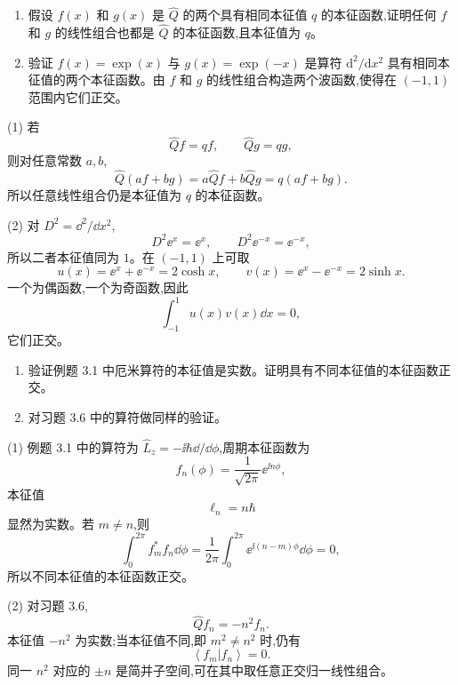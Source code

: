 \begin{question}
\begin{enumerate}
\item 假设 $f(x)$ 和 $g(x)$ 是 $\hat Q$ 的两个具有相同本征值 $q$ 的本征函数,证明任何 $f$ 和 $g$ 的线性组合也都是 $\hat Q$ 的本征函数,且本征值为 $q$。
\item 验证 $f(x)=\exp(x)$ 与 $g(x)=\exp(-x)$ 是算符 $\mathrm d^2/\mathrm dx^2$ 具有相同本征值的两个本征函数。由 $f$ 和 $g$ 的线性组合构造两个波函数,使得在 $(-1,1)$ 范围内它们正交。
\end{enumerate}
\end{question}
\begin{solution}
(1) 若
\[
\hat Q f=qf,
\qquad
\hat Q g=qg,
\]
则对任意常数 $a,b$,
\[
\hat Q(af+bg)=a\hat Qf+b\hat Qg=q(af+bg).
\]
所以任意线性组合仍是本征值为 $q$ 的本征函数。

(2) 对 $D^2=\dd^2/\dd x^2$,
\[
D^2\ee^x=\ee^x,
\qquad
D^2\ee^{-x}=\ee^{-x},
\]
所以二者本征值同为 $1$。在 $(-1,1)$ 上可取
\[
u(x)=\ee^x+\ee^{-x}=2\cosh x,
\qquad
v(x)=\ee^x-\ee^{-x}=2\sinh x.
\]
一个为偶函数,一个为奇函数,因此
\[
\int_{-1}^{1}u(x)v(x)\dd x=0,
\]
它们正交。
\end{solution}

\begin{question}
\begin{enumerate}
\item 验证例题 3.1 中厄米算符的本征值是实数。证明具有不同本征值的本征函数正交。
\item 对习题 3.6 中的算符做同样的验证。
\end{enumerate}
\end{question}
\begin{solution}
(1) 例题 3.1 中的算符为 $\hat L_z=-\ii\hbar\dd/\dd\phi$,周期本征函数为
\[
f_n(\phi)=\frac1{\sqrt{2\pi}}\ee^{\ii n\phi},
\]
本征值
\[
\ell_n=n\hbar
\]
显然为实数。若 $m\ne n$,则
\[
\int_0^{2\pi} f_m^*f_n\dd\phi
=\frac1{2\pi}\int_0^{2\pi}\ee^{\ii(n-m)\phi}\dd\phi=0,
\]
所以不同本征值的本征函数正交。

(2) 对习题 3.6,
\[
\hat Qf_n=-n^2f_n.
\]
本征值 $-n^2$ 为实数;当本征值不同,即 $m^2\ne n^2$ 时,仍有
\[
\left\langle f_m|f_n \right\rangle=0.
\]
同一 $n^2$ 对应的 $\pm n$ 是简并子空间,可在其中取任意正交归一线性组合。
\end{solution}


